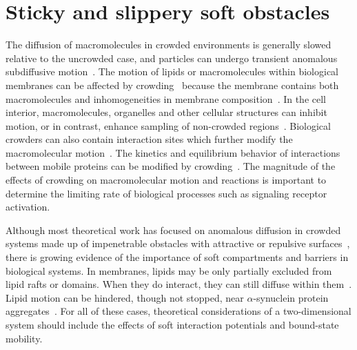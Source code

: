 \chapter{Sticky and slippery soft obstacles}\label{ch02_soft}

The diffusion of macromolecules in crowded environments is generally slowed
relative to the uncrowded case, and particles can undergo transient
anomalous subdiffusive motion~\cite{hofling_anomalous_13}.  The motion of lipids or
macromolecules within biological membranes can be affected by
crowding~\cite{schutz_singlemolecule_97,schutz_properties_00,
  nicolau_sources_07, weigel_ergodic_11, javanainen_anomalous_13,
  krapf_mechanisms_15, jeon_protein_16, sadegh_plasma_17} because the membrane
contains both macromolecules and inhomogeneities in membrane
composition~\cite{petropoulos_membrane_90, veatch_organization_02}. In the cell
interior, macromolecules, organelles and other cellular structures can inhibit
motion, or in contrast, enhance sampling of non-crowded
regions~\cite{stylianidou_cytoplasmic_14}.  Biological crowders can also contain
interaction sites which further modify the macromolecular
motion~\cite{crowley_protein_11}.  The kinetics and equilibrium behavior of
interactions between mobile proteins can be modified by
crowding~\cite{mourao_connecting_14, zhdanov_kinetics_15}. The magnitude of the
effects of crowding on macromolecular motion and reactions is important to
determine the limiting rate of biological processes such as signaling receptor
activation.
 
Although most theoretical work has focused on anomalous diffusion in crowded
systems made up of impenetrable obstacles with attractive or repulsive
surfaces~\cite{saxton_lateral_87, saxton_anomalous_94, saxton_anomalous_96,
  ellery_characterizing_14, ellery_analytical_16}, there is growing evidence of
the importance of soft compartments and barriers in biological systems.  In
membranes, lipids may be only partially excluded from lipid rafts or domains.
When they do interact, they can still diffuse within
them~\cite{fujiwara_phospholipids_02, forstner_attractive_08,
  ehrig_nearcritical_11, silvius_partitioning_05}.  Lipid motion can be
hindered, though not stopped, near $\alpha$-synuclein protein
aggregates~\cite{iyer_membranebound_16}. For all of these cases, theoretical
considerations of a two-dimensional system should include the effects of soft
interaction potentials and bound-state mobility.

